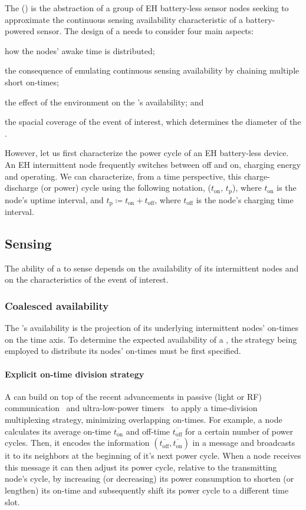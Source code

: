 The \fullcis (\cis) is the abstraction of a group of EH battery-less sensor nodes seeking to approximate the continuous sensing availability characteristic of a battery-powered sensor. The design of a \cis needs to consider four main aspects: 
\begin{enumerate*}[label=(\roman*)]
\item how the nodes' awake time is distributed; 
\item the consequence of emulating continuous sensing availability by chaining multiple short on-times; 
\item the effect of the environment on the \cis's availability; and 
\item the spacial coverage of the event of interest, which determines the diameter of the \cis.
\end{enumerate*}

However, let us first characterize the power cycle of an EH battery-less device. 
An EH intermittent node frequently switches between off and on, charging energy and operating. We can characterize, from a time perspective, this charge-discharge (or power) cycle using the following notation, ($t_\text{on}$, $t_\text{p}$), where $t_\text{on}$ is the node's uptime interval, and $t_\text{p} \coloneqq t_\text{on} + t_\text{off}$, where $t_\text{off}$ is the node's charging time interval.

\subsection{Sensing}
The ability of a \cis to sense depends on the availability of its intermittent nodes and on the characteristics of the event of interest. 

\subsubsection{Coalesced availability}
\label{subSec:availability}
The \cis's availability is the projection of its underlying intermittent nodes' on-times on the time axis. 
To determine the expected availability of a \cis, the strategy being employed to distribute its nodes' on-times must be first specified.
%
\paragraph{Explicit on-time division strategy}
A \cis can build on top of the recent advancements in passive (light or RF)
communication~\cite{liu2013ambient}
and ultra-low-power timers~\cite{hester2017timely} to apply a
time-division multiplexing strategy, minimizing overlapping on-times. For
example, a node calculates its average on-time $\overline{t_\text{on}}$
and off-time $\overline{t_\text{off}}$ for a certain number of power
cycles. Then, it encodes the information $({\overline{t_\text{off}},
\overline{t_\text{on}}})$ in a message and broadcasts it to its neighbors at
the beginning of it's next power cycle.
When a node receives this message 
it can then adjust
its power cycle, relative to the transmitting node's cycle, by increasing
(or decreasing) its power consumption to shorten (or lengthen) its
on-time and subsequently shift its power cycle to a different time slot.

